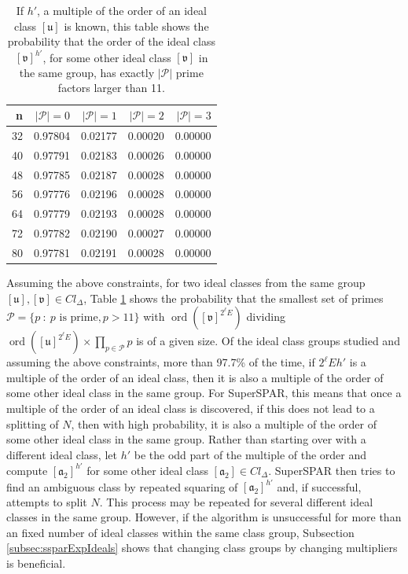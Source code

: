 \documentclass{ucalgthes1}
\theoremstyle{definition}
\DeclareMathOperator{\ord}{ord}
\newcommand{\set}{\mathcal}
\newcommand{\ideal}{\mathfrak}
\newcommand{\idealclass}[1]{\left[ \ideal #1 \right]}
\begin{document}
\begin{table}[htb]
\centering
\begin{tabular}{| r | r | r | r | r |}
	\hline
	n & $|\set P| = 0$ & $|\set P| = 1$ & $|\set P| = 2$ & $|\set P| = 3$ \\
	\hline
32 & 0.97804 & 0.02177 & 0.00020 & 0.00000 \\
40 & 0.97791 & 0.02183 & 0.00026 & 0.00000 \\
48 & 0.97785 & 0.02187 & 0.00028 & 0.00000 \\
56 & 0.97776 & 0.02196 & 0.00028 & 0.00000 \\
64 & 0.97779 & 0.02193 & 0.00028 & 0.00000 \\
72 & 0.97782 & 0.02190 & 0.00027 & 0.00000 \\
80 & 0.97781 & 0.02191 & 0.00028 & 0.00000 \\
	\hline
\end{tabular}
\caption[Probability that $\idealclass v^{h'}$ has $|\mathcal P|$ factors.]{If $h'$, a multiple of the order of an ideal class $\idealclass u$ is known, this table shows the probability that the order of the ideal class ${\idealclass v}^{h'}$, for some other ideal class $\idealclass v$ in the same group, has exactly $|\set P|$ prime factors larger than 11.}
\label{tab:diffOfOrderOfTwoIdeals}
\end{table}

Assuming the above constraints, for two ideal classes from the same group $\idealclass u, \idealclass v \in Cl_\Delta$, Table \ref{tab:diffOfOrderOfTwoIdeals} shows the probability that the smallest set of primes $\set P = \{ p ~:~ p \textrm{ is prime}, p > 11 \}$ with $\ord({\idealclass v}^{2^\ell E})$ dividing $\ord({\idealclass u}^{2^\ell E}) \times \prod_{p \in \set P} p$ is of a given size.  Of the ideal class groups studied and assuming the above constraints, more than 97.7\% of the time, if $2^\ell Eh'$ is a multiple of the order of an ideal class, then it is also a multiple of the order of some other ideal class in the same group.  For SuperSPAR, this means that once a multiple of the order of an ideal class is discovered, if this does not lead to a splitting of $N$, then with high probability, it is also a multiple of the order of some other ideal class in the same group.  Rather than starting over with a different ideal class, let $h'$ be the odd part of the multiple of the order and compute $\idealclass{a_2}^{h'}$ for some other ideal class $\idealclass{a_2} \in Cl_\Delta$.  SuperSPAR then tries to find an ambiguous class by repeated squaring of $\idealclass{a_2}^{h'}$ and, if successful, attempts to split $N$.  This process may be repeated for several different ideal classes in the same group.  However, if the algorithm is unsuccessful for more than an fixed number of ideal classes within the same class group, Subsection \ref{subsec:ssparExpIdeals} shows that changing class groups by changing multipliers is beneficial.
\end{document}
